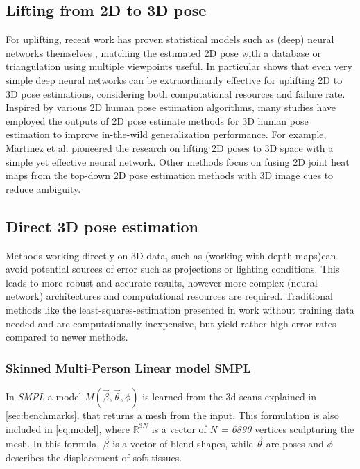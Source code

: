 \subsection{Lifting from 2D to 3D pose}
For uplifting, recent work has proven statistical models such as (deep) neural networks themselves \cite{Tome_2017_CVPR, Martinez_2017_ICCV}, matching the estimated 2D pose with a database \cite{Chen_2017_CVPR} or triangulation using multiple viewpoints \cite{Dong_2019_CVPR} useful. In particular \cite{Martinez_2017_ICCV} shows that even very simple deep neural networks can be extraordinarily effective for uplifting 2D to 3D pose estimations, considering both computational resources and failure rate.
\newline
Inspired by various 2D human pose estimation algorithms, many studies have employed the outputs of 2D pose estimate methods for 3D human pose estimation to improve in-the-wild generalization performance. For example, Martinez et al. \cite{Martinez_2017_ICCV} pioneered the research on lifting 2D poses to 3D space with a simple yet effective neural network. Other methods \cite{park_3d_2016, wang_deep_2021, zhou_hemlets_2019, habibie_wild_2019, tekin_learning_2017} focus on fusing 2D joint heat maps from the top-down 2D pose estimation methods with 3D image cues to reduce ambiguity. 
\subsection{Direct 3D pose estimation}
Methods working directly on 3D data, such as \cite{Ye2011} (working with depth maps)can avoid potential sources of error such as projections or lighting conditions. This leads to more robust and accurate results, however more complex (neural network) architectures and computational resources are required. Traditional methods like the least-squares-estimation presented in \cite{Haralick98} work without training data needed and are computationally inexpensive, but yield rather high error rates compared to newer methods.

\subsubsection{Skinned Multi-Person Linear model SMPL}
In \emph{SMPL} a model $M(\vec{\beta},\vec{\theta},\phi)$ is learned from the 3d scans explained in \autoref{sec:benchmarks}, that returns a mesh from the input. This formulation is also included in \autoref{eq:model}, where $\mathbb{R}^{3N}$ is a vector of \emph{N = 6890} vertices sculpturing the mesh. In this formula, $\vec{\beta}$ is a vector of blend shapes, while $\vec{\theta}$ are poses and $\phi$ describes the displacement of soft tissues.

